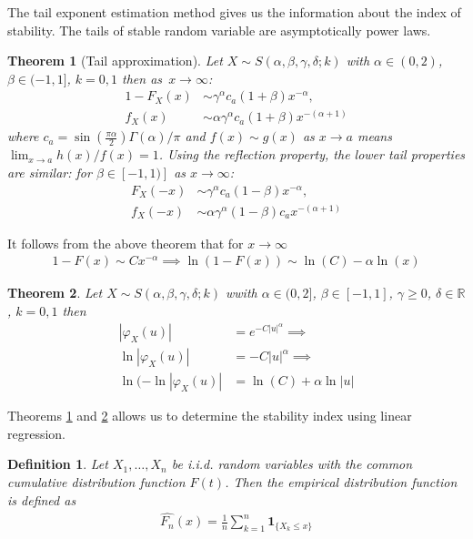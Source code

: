 \documentclass{article}
\newtheorem{theorem}{Theorem}
\newtheorem{definition}{Definition}
\begin{document}
		The tail exponent estimation method gives us the information
		about the index of stability. The tails of stable random variable are asymptotically power laws. 
		\begin{theorem}[Tail approximation] Let $X \sim S(\alpha, \beta , \gamma, \delta; k)$ with $\alpha \in (0,2)$, $\beta \in (-1,1]$, $k=0,1$ then as~$x\to \infty$:
			\label{theorem:Tail approximation}
			\begin{align*}
				1 - F_X(x) &\sim \gamma^\alpha c_a (1+\beta)x^{-\alpha},\\
				f_X(x) &\sim \alpha \gamma^\alpha c_a (1+\beta) x^{-(\alpha + 1)}
			\end{align*}
			where $c_a = \sin(\frac{\pi\alpha}{2})\Gamma(\alpha)/\pi$ and $f(x)\sim g(x)$ as $x\to a$ means $\lim_{x\to a} h(x)/f(x) = 1$. Using the reflection property, the lower tail properties are
			similar: for $\beta\in[-1,1)]$ as $x \to \infty$:
			\begin{align*}
				F_X(-x) &\sim  \gamma^\alpha c_a (1-\beta)x^{-\alpha},\\
				f_X(-x) &\sim  \alpha \gamma^\alpha (1-\beta)c_a x^{-(\alpha + 1)}
			\end{align*}
		\end{theorem}
		It follows from the above theorem that for $x\to\infty$
		\begin{gather*}
			1 - F(x) \sim Cx^{-\alpha} \implies \ln(1-F(x)) \sim \ln(C) -\alpha \ln(x)
		\end{gather*}

		\begin{theorem}  Let $X \sim S(\alpha, \beta , \gamma, \delta; k)$ wwith $\alpha \in (0,2]$, $\beta \in [-1,1]$, $\gamma \ge 0$, $\delta\in\mathbb{R}$, $k=0,1$ then
			\label{theorem:CF}
			\begin{align*}
				|\varphi_X(u)| &= e^{-C|u|^\alpha} \implies \\
				\ln |\varphi_X(u)| &= -C|u|^\alpha \implies \\
				\ln(-\ln |\varphi_X(u)| &= \ln(C) + \alpha\ln|u|
			\end{align*}
		\end{theorem}
		Theorems \ref{theorem:Tail approximation} and \ref{theorem:CF} allows us to determine the stability index using linear regression.

		\begin{definition}Let $X_1,\dots, X_n$ be i.i.d. random variables with the common cumulative distribution function $F(t)$. 
			Then the empirical distribution function is defined as
			\begin{gather*}
				\hat{F_n}(x) = \frac{1}{n}\sum_{k = 1}^{n}\mathbf{1}_{\{X_k \le x\}}
			\end{gather*}
		\end{definition}
		
\end{document}
